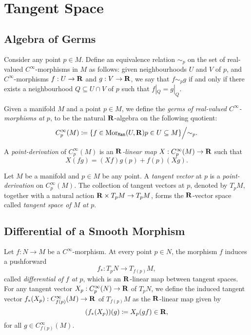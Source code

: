 \section{Tangent Space}

\subsection{Algebra of Germs}

Consider any point \(p \in M\). Define an equivalence relation \(\sim_p\) on
the set of real-valued \(C^{\infty}\)-morphisms in \(M\) as follows: given
neighbourhoods \(U\) and \(V\) of \(p\), and \(C^{\infty}\)-morphisms
\(f: U \to \mathbf{R}\) and \(g: V \to \mathbf{R}\), we say that \(f \sim_p g\) if and only if there
exists a neighbourhood \(Q \subseteq U \cap V\) of \(p\) such that \(f|_Q =
g|_Q\).

\begin{definition}
    \label{def:algebra-of-germs-manifold}
    Given a manifold \(M\) and a point \(p \in M\), we define the \emph{germs of
        real-valued \(C^{\infty}\)-morphisms at \(p\)}, to be the natural
    \(\mathbf{R}\)-algebra on the following quotient:
    \[
        C_p^{\infty}(M) \coloneq
        \{f \in \operatorname{Mor}_{{\texttt{Man}}}(U, \mathbf{R}) \relax p \in U \subseteq M\}
        \Big/{\sim_p}.
    \]

    A \emph{point-derivation} of \(C_p^{\infty}(M)\) is an \emph{\(\mathbf{R}\)-linear map}
    \(X: C_p^{\infty}(M) \to \mathbf{R}\) such that
    \[
        X(f g) = (X f) g(p) + f(p) (X g).
    \]
\end{definition}

\begin{definition}
    \label{def:tangent-vector-at-point-manifold}
    Let \(M\) be a manifold and \(p \in M\) be any point. A \emph{tangent vector} at
    \(p\) is a \emph{point-derivation} on \(C_p^{\infty}(M)\). The collection of
    tangent vectors at \(p\), denoted by \(T_p M\), together with a natural action
    \(\mathbf{R} \times T_p M \to T_p M\), forms the \(\mathbf{R}\)-vector space called
    \emph{tangent space of \(M\) at \(p\)}.
\end{definition}

\subsection{Differential of a Smooth Morphism}

\begin{definition}
    \label{def:differential-at-a-point}
    Let \(f: N \to M\) be a \(C^{\infty}\)-morphism. At every point \(p \in N\), the
    morphism \(f\) induces a pushforward
    \[
        f_{*}: T_p N \longrightarrow T_{f(p)} M,
    \]
    called \emph{differential of \(f\) at \(p\)}, which is an \(\mathbf{R}\)-linear map
    between tangent spaces. For any tangent vector \(X_p: C_p^{\infty}(N) \to \mathbf{R}\) of
    \(T_p N\), we define the induced tangent vector
    \(f_{*}(X_p): C_{f(p)}^{\infty}(M) \to \mathbf{R}\) of \(T_{f(p)} M\) as the
    \(\mathbf{R}\)-linear map given by
    \[
        (f_{*}(X_p))(g) \coloneq X_p(g f) \in \mathbf{R},
    \]
    for all \(g \in C_{f(p)}^{\infty}(M)\).
\end{definition}

